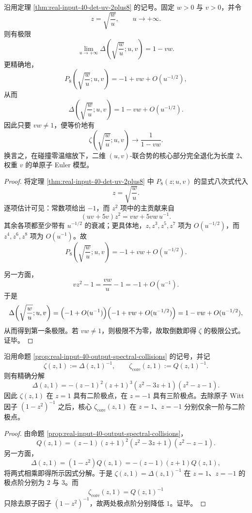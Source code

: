 

\begin{theorem}\label{thm:xi-time-part73-twoparam-collision-freezing-single-atom-collapse}
沿用定理 \ref{thm:real-input-40-det-uv-2plus8} 的记号。固定 \(w>0\) 与 \(v>0\)，并令
\[
z=\sqrt{\frac{w}{u}},
\qquad
u\to+\infty.
\]
则有极限
\[
\boxed{\;
\lim_{u\to+\infty}\Delta\!\left(\sqrt{\frac{w}{u}};u,v\right)
=
1-vw.\;}
\]
更精确地，
\[
\boxed{\;
P_8\!\left(\sqrt{\frac{w}{u}};u,v\right)
=
-1+vw+O(u^{-1/2}),\;}
\]
从而
\[
\boxed{\;
\Delta\!\left(\sqrt{\frac{w}{u}};u,v\right)
=
1-vw+O(u^{-1/2}).\;}
\]
因此只要 \(vw\neq 1\)，便等价地有
\[
\boxed{\;
\zeta\!\left(\sqrt{\frac{w}{u}};u,v\right)
\longrightarrow
\frac{1}{1-vw}.\;}
\]
换言之，在碰撞零温缩放下，二维 \((u,v)\)-联合势的核心部分完全退化为长度 \(2\)、权重 \(v\) 的单原子 Euler 模型。
\end{theorem}
\begin{proof}
将定理 \ref{thm:real-input-40-det-uv-2plus8} 中 \(P_8(z;u,v)\) 的显式八次式代入
\[
z=\sqrt{\frac{w}{u}}.
\]
逐项估计可见：常数项给出 \(-1\)，而 \(z^2\) 项中的主贡献来自
\[
(uv+5v)z^2=vw+5vw\,u^{-1}.
\]
其余各项都至少带有 \(u^{-1/2}\) 的衰减；更具体地，\(z,z^3,z^5,z^7\) 项为 \(O(u^{-1/2})\)，而 \(z^4,z^6,z^8\) 项为 \(O(u^{-1})\)。故
\[
P_8\!\left(\sqrt{\frac{w}{u}};u,v\right)
=
-1+vw+O(u^{-1/2}).
\]

另一方面，
\[
vz^2-1
=
\frac{vw}{u}-1
=
-1+O(u^{-1}).
\]
于是
\[
\Delta\!\left(\sqrt{\frac{w}{u}};u,v\right)
=
\Bigl(-1+O(u^{-1})\Bigr)
\Bigl(-1+vw+O(u^{-1/2})\Bigr)
=
1-vw+O(u^{-1/2}),
\]
从而得到第一条极限。若 \(vw\neq 1\)，则极限不为零，故取倒数即得 \(\zeta\) 的极限公式。证毕。
\end{proof}

\begin{theorem}[\texorpdfstring{$u=1$}{u=1} 处 \texorpdfstring{$\zeta$}{zeta} 的双--三极点律]\label{thm:xi-time-part73-u1-zeta-double-triple-pole}
沿用命题 \ref{prop:real-input-40-output-spectral-collisions} 的记号，并记
\[
\zeta(z,1):=\Delta(z,1)^{-1},
\qquad
\zeta_{\mathrm{core}}(z,1):=Q(z,1)^{-1}.
\]
则有精确分解
\[
\Delta(z,1)=-(z-1)^2(z+1)^3(z^2-3z+1)(z^2-z-1).
\]
因此 \(\zeta(z,1)\) 在 \(z=1\) 具有二阶极点，在 \(z=-1\) 具有三阶极点。去除原子 Witt 因子 \((1-z^2)^{-1}\) 之后，核心 \(\zeta_{\mathrm{core}}(z,1)\) 在 \(z=1\)、\(z=-1\) 分别仅余一阶与二阶极点。
\end{theorem}
\begin{proof}
由命题 \ref{prop:real-input-40-output-spectral-collisions}，
\[
Q(z,1)=(z-1)(z+1)^2(z^2-3z+1)(z^2-z-1).
\]
另一方面，
\[
\Delta(z,1)=(1-z^2)Q(z,1)=-(z-1)(z+1)Q(z,1),
\]
将两式相乘即得所示因式分解。于是 \(\zeta(z,1)=\Delta(z,1)^{-1}\) 在 \(z=1\)、\(z=-1\) 的极点阶分别为 \(2\) 与 \(3\)。而
\[
\zeta_{\mathrm{core}}(z,1)=Q(z,1)^{-1}
\]
只除去原子因子 \((1-z^2)^{-1}\)，故两处极点阶分别降低 \(1\)。证毕。
\end{proof}

